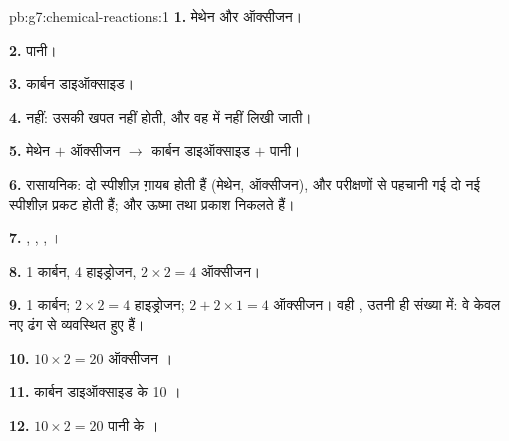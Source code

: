 \begin{solution}{pb:g7:chemical-reactions:1}
\textbf{1.} मेथेन और ऑक्सीजन।

\textbf{2.} पानी।

\textbf{3.} कार्बन डाइऑक्साइड।

\textbf{4.} नहीं: उसकी खपत नहीं होती, और वह  में नहीं
लिखी जाती।

\textbf{5.} मेथेन $+$ ऑक्सीजन $\longrightarrow$ कार्बन डाइऑक्साइड $+$
पानी।

\textbf{6.} रासायनिक: दो स्पीशीज़ ग़ायब होती हैं (मेथेन, ऑक्सीजन), और परीक्षणों
से पहचानी गई दो नई स्पीशीज़ प्रकट होती हैं; और ऊष्मा तथा प्रकाश निकलते हैं।

\textbf{7.} , , , ।

\textbf{8.} 1 कार्बन, 4 हाइड्रोजन, $2 \times 2 = 4$ ऑक्सीजन।

\textbf{9.} 1 कार्बन; $2 \times 2 = 4$ हाइड्रोजन; $2 + 2 \times 1 = 4$
ऑक्सीजन। वही , उतनी ही संख्या में: वे केवल नए ढंग से
व्यवस्थित हुए हैं।

\textbf{10.} $10 \times 2 = 20$ ऑक्सीजन ।

\textbf{11.} कार्बन डाइऑक्साइड के 10 ।

\textbf{12.} $10 \times 2 = 20$ पानी के ।
\end{solution}
